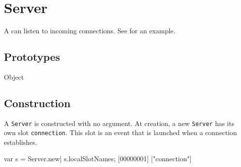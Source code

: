 
\section{Server}

A  can listen to incoming connections.  See
 for an example.

\subsection{Prototypes}
\begin{refObjects}
\item[Object]
\end{refObjects}

\subsection{Construction}

A \lstinline|Server| is constructed with no argument. At creation, a
new \lstinline|Server| has its own slot \lstinline|connection|. This
slot is an event that is launched when a connection establishes.

\begin{urbiscript}
var s = Server.new|
s.localSlotNames;
[00000001] ["connection"]
\end{urbiscript}

